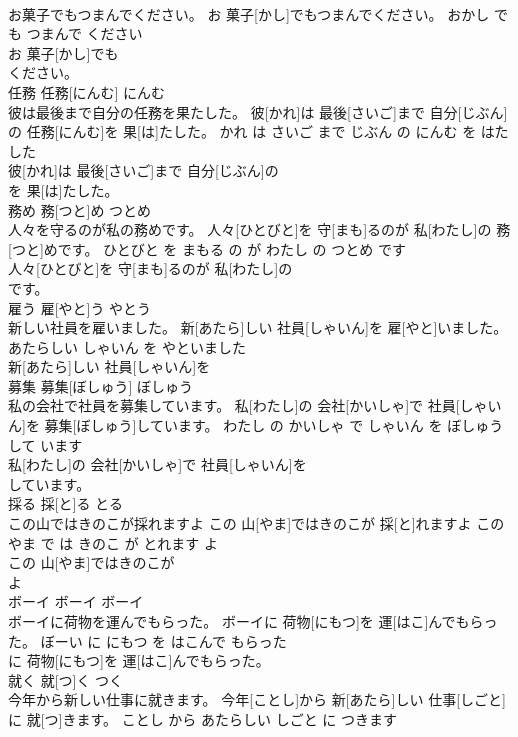\documentclass[8pt]{extreport}
\begin{document}
\begin{CJK}{UTF8}{min}
\\	お菓子でもつまんでください。	お 菓子[かし]でもつまんでください。	おかし で も つまんで ください	
\\	お 菓子[かし]でも
\\	ください。			
\\	任務	任務[にんむ]	にんむ	
\\	彼は最後まで自分の任務を果たした。	彼[かれ]は 最後[さいご]まで 自分[じぶん]の 任務[にんむ]を 果[は]たした。	かれ は さいご まで じぶん の にんむ を はたした	
\\	彼[かれ]は 最後[さいご]まで 自分[じぶん]の
\\	を 果[は]たした。			
\\	務め	務[つと]め	つとめ	
\\	人々を守るのが私の務めです。	人々[ひとびと]を 守[まも]るのが 私[わたし]の 務[つと]めです。	ひとびと を まもる の が わたし の つとめ です	
\\	人々[ひとびと]を 守[まも]るのが 私[わたし]の
\\	です。			
\\	雇う	雇[やと]う	やとう	
\\	新しい社員を雇いました。	新[あたら]しい 社員[しゃいん]を 雇[やと]いました。	あたらしい しゃいん を やといました	
\\	新[あたら]しい 社員[しゃいん]を
\\	募集	募集[ぼしゅう]	ぼしゅう	
\\	私の会社で社員を募集しています。	私[わたし]の 会社[かいしゃ]で 社員[しゃいん]を 募集[ぼしゅう]しています。	わたし の かいしゃ で しゃいん を ぼしゅう して います	
\\	私[わたし]の 会社[かいしゃ]で 社員[しゃいん]を
\\	しています。			
\\	採る	採[と]る	とる	
\\	この山ではきのこが採れますよ	この 山[やま]ではきのこが 採[と]れますよ	この やま で は きのこ が とれます よ	
\\	この 山[やま]ではきのこが
\\	よ			
\\	ボーイ	ボーイ	ボーイ	
\\	ボーイに荷物を運んでもらった。	ボーイに 荷物[にもつ]を 運[はこ]んでもらった。	ぼーい に にもつ を はこんで もらった	
\\	に 荷物[にもつ]を 運[はこ]んでもらった。			
\\	就く	就[つ]く	つく	
\\	今年から新しい仕事に就きます。	今年[ことし]から 新[あたら]しい 仕事[しごと]に 就[つ]きます。	ことし から あたらしい しごと に つきます	

\end{CJK}
\end{document}
